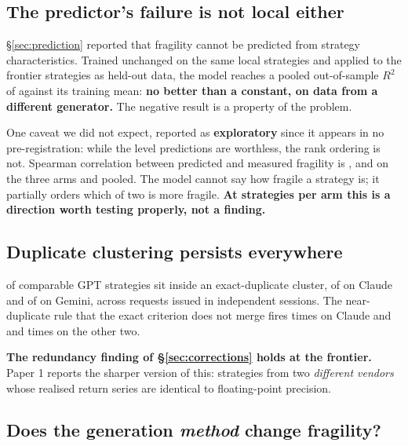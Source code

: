 \documentclass[11pt,a4paper]{article}
\begin{document}
\subsection{The predictor's failure is not local either}

\S\ref{sec:prediction} reported that fragility cannot be predicted from strategy characteristics.
Trained unchanged on the same \rsGvPredTrainN{} local strategies and applied to the
\rsGvPredPooledN{} frontier strategies as held-out data, the model reaches a pooled out-of-sample
$R^2$ of \rsGvPredPooledRsq{} against its training mean: \textbf{no better than a constant, on data
from a different generator.} The negative result is a property of the problem.

\begin{scopebox}
One caveat we did not expect, reported as \textbf{exploratory} since it appears in no
pre-registration: while the level predictions are worthless, the rank ordering is not. Spearman
correlation between predicted and measured fragility is \rsGvGptPredSpearman{},
\rsGvClaudePredSpearman{} and \rsGvGeminiPredSpearman{} on the three arms and
\rsGvPredPooledSpearman{} pooled. The model cannot say how fragile a strategy is; it partially
orders which of two is more fragile. \textbf{At \rsGvGptN{} strategies per arm this is a direction
worth testing properly, not a finding.}
\end{scopebox}

\subsection{Duplicate clustering persists everywhere}

\rsGvGptDupCovered{} of \rsGvGptDupCompared{} comparable GPT strategies sit inside an
exact-duplicate cluster, \rsGvClaudeDupCovered{} of \rsGvClaudeDupCompared{} on Claude and
\rsGvGeminiDupCovered{} of \rsGvGeminiDupCompared{} on Gemini, across requests issued in
independent sessions. The near-duplicate rule that the exact criterion does not merge fires
\rsGvClaudeNearPairs{} times on Claude and \rsGvGptNearPairs{} and \rsGvGeminiNearPairs{} times on
the other two.

\textbf{The redundancy finding of \S\ref{sec:corrections} holds at the frontier.} Paper 1 reports
the sharper version of this: strategies from two \emph{different vendors} whose realised return
series are identical to floating-point precision.

\subsection{Does the generation \emph{method} change fragility?}
\end{document}
